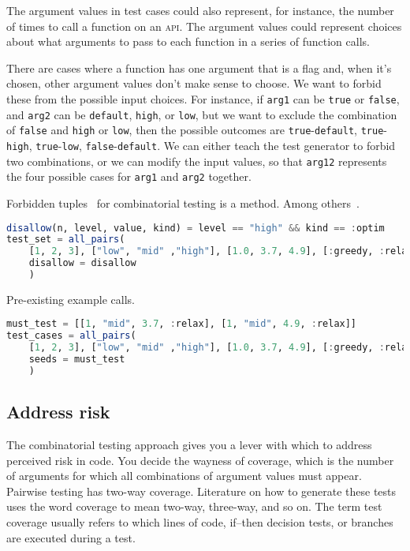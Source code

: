 \documentclass{juliacon}
\begin{document}
\vskip 6pt
The argument values in test cases could also represent, for instance, the number of times to call a function on an \textsc{api}. The argument values could represent choices about what arguments to pass to each function in a series of function calls.

\vskip 6pt
There are cases where a function has one argument that is a flag and, when it's chosen, other argument values don't make sense to choose. We want to forbid these from the possible input choices. For instance, if \verb|arg1| can be \verb|true| or \verb|false|, and \verb|arg2| can be \verb|default|, \verb|high|, or \verb|low|, but we want to exclude the combination of \verb|false| and \verb|high| or \verb|low|, then the possible outcomes are \verb|true|-\verb|default|, \verb|true|-\verb|high|, \verb|true|-\verb|low|, \verb|false|-\verb|default|. We can either teach the test generator to forbid two combinations, or we can modify the input values, so that \verb|arg12| represents the four possible cases for \verb|arg1| and \verb|arg2| together.

\vskip 6pt
Forbidden tuples~\cite{Petke2015-ex} for combinatorial testing is a method. Among others~\cite{Grindal2006-vy}.
\begin{lstlisting}[language=Julia]
disallow(n, level, value, kind) = level == "high" && kind == :optim
test_set = all_pairs(
    [1, 2, 3], ["low", "mid" ,"high"], [1.0, 3.7, 4.9], [:greedy, :relax, :optim];
    disallow = disallow
    )
\end{lstlisting}

\vskip 6pt
Pre-existing example calls.
\begin{lstlisting}[language=Julia]
must_test = [[1, "mid", 3.7, :relax], [1, "mid", 4.9, :relax]]
test_cases = all_pairs(
    [1, 2, 3], ["low", "mid" ,"high"], [1.0, 3.7, 4.9], [:greedy, :relax, :optim];
    seeds = must_test
    )
\end{lstlisting}

\subsection{Address risk}

The combinatorial testing approach gives you a lever with which to address perceived risk in code. You decide the wayness of coverage, which is the number of arguments for which all combinations of argument values must appear. Pairwise testing has two-way coverage. Literature on how to generate these tests uses the word coverage to mean two-way, three-way, and so on. The term test coverage usually refers to which lines of code, if--then decision tests, or branches are executed during a test.
\end{document}
